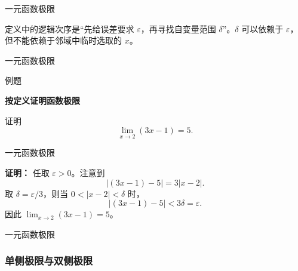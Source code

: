 \documentclass[aspectratio=169,10pt,fontset=fandol]{ctexbeamer}
\newenvironment{custom}[1]{\par\noindent\textbf{#1}\quad}{\par\vspace{0.8em}}
\begin{document}
\begin{frame}[t,fragile]{一元函数极限}
\footnotesize
{\footnotesize
定义中的逻辑次序是“先给误差要求 \(\varepsilon\)，再寻找自变量范围 \(\delta\)”。\(\delta\) 可以依赖于 \(\varepsilon\)，但不能依赖于邻域中临时选取的 \(x\)。


}
\end{frame}
\begin{frame}[t,fragile]{一元函数极限}
\footnotesize
\begin{block}{例题}
{\footnotesize
\textbf{按定义证明函数极限}\par

证明
\[
\lim_{x\to2}(3x-1)=5.
\]

}
\end{block}
\end{frame}
\begin{frame}[t,fragile]{一元函数极限}
\footnotesize
{\footnotesize
\textbf{证明：}
任取 \(\varepsilon>0\)。注意到
\[
|(3x-1)-5|=3|x-2|.
\]
取 \(\delta=\varepsilon/3\)，则当 \(0<|x-2|<\delta\) 时，
\[
|(3x-1)-5|<3\delta=\varepsilon.
\]
因此 \(\lim_{x\to2}(3x-1)=5\)。

}
\end{frame}
\begin{frame}[t,fragile]{一元函数极限}
\footnotesize
{\footnotesize
\subsubsection*{单侧极限与双侧极限}


}
\end{frame}
\end{document}
